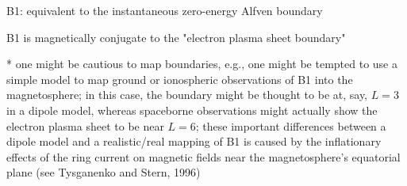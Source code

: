 
 B1: equivalent to the instantaneous zero-energy Alfven boundary

 B1 is magnetically conjugate to the "electron plasma sheet boundary"

 * one might be cautious to map boundaries, e.g., one might be tempted
 to use a simple model to map ground or ionospheric observations of B1
 into the magnetosphere; in this case, the boundary might be thought to
 be at, say, $L=3$ in a dipole model, whereas spaceborne observations
 might actually show the electron plasma sheet to be near $L=6$; these
 important differences between a dipole model and a realistic/real
 mapping of B1 is caused by the inflationary effects of the ring current
 on magnetic fields near the magnetosphere's equatorial plane (see
 Tysganenko and Stern, 1996)
